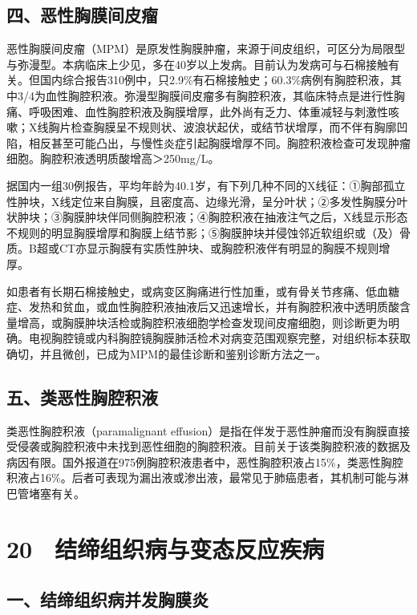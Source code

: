 \subsection{四、恶性胸膜间皮瘤}

恶性胸膜间皮瘤（MPM）是原发性胸膜肿瘤，来源于间皮组织，可区分为局限型与弥漫型。本病临床上少见，多在40岁以上发病。目前认为发病可与石棉接触有关。但国内综合报告310例中，只2.9\%有石棉接触史；60.3\%病例有胸腔积液，其中3/4为血性胸腔积液。弥漫型胸膜间皮瘤多有胸腔积液，其临床特点是进行性胸痛、呼吸困难、血性胸腔积液及胸膜增厚，此外尚有乏力、体重减轻与刺激性咳嗽；X线胸片检查胸膜呈不规则状、波浪状起伏，或结节状增厚，而不伴有胸廓凹陷，相反甚至可能凸出，与慢性炎症引起胸膜增厚不同。胸腔积液检查可发现肿瘤细胞。胸腔积液透明质酸增高＞250mg/L。

据国内一组30例报告，平均年龄为40.1岁，有下列几种不同的X线征：①胸部孤立性肿块，X线定位来自胸膜，且密度高、边缘光滑，呈分叶状；②多发性胸膜分叶状肿块；③胸膜肿块伴同侧胸腔积液；④胸腔积液在抽液注气之后，X线显示形态不规则的明显胸膜增厚和胸膜上结节影；⑤胸膜肿块并侵蚀邻近软组织或（及）骨质。B超或CT亦显示胸膜有实质性肿块、或胸腔积液伴有明显的胸膜不规则增厚。

如患者有长期石棉接触史，或病变区胸痛进行性加重，或有骨关节疼痛、低血糖症、发热和贫血，或血性胸腔积液抽液后又迅速增长，并有胸腔积液中透明质酸含量增高，或胸膜肿块活检或胸腔积液细胞学检查发现间皮瘤细胞，则诊断更为明确。电视胸腔镜或内科胸腔镜胸膜肺活检术对病变范围观察完整，对组织标本获取确切，并且微创，已成为MPM的最佳诊断和鉴别诊断方法之一。

\subsection{五、类恶性胸腔积液}

类恶性胸腔积液（paramalignant
effusion）是指在伴发于恶性肿瘤而没有胸膜直接受侵袭或胸腔积液中未找到恶性细胞的胸腔积液。目前关于该类胸腔积液的数据及病因有限。国外报道在975例胸腔积液患者中，恶性胸腔积液占15\%，类恶性胸腔积液占16\%。后者可表现为漏出液或渗出液，最常见于肺癌患者，其机制可能与淋巴管堵塞有关。

\protect\hypertarget{text00072.html}{}{}

\section{20　结缔组织病与变态反应疾病}

\subsection{一、结缔组织病并发胸膜炎}

